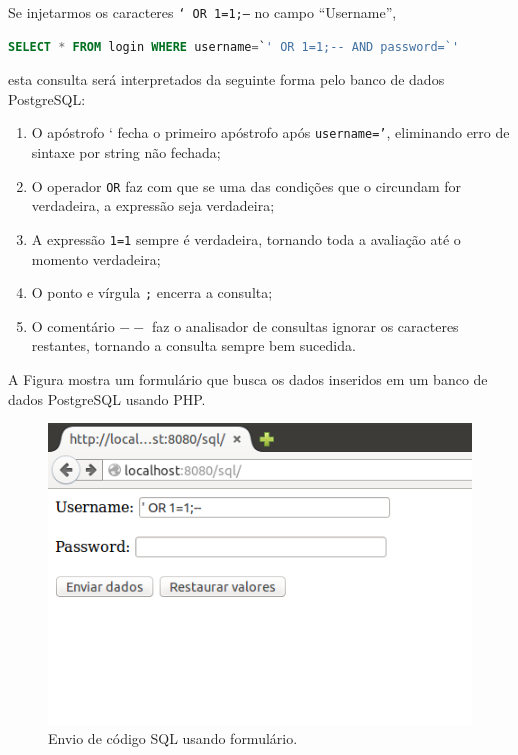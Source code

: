 \begin{frame}[fragile]{}

Se injetarmos os caracteres {\tt ` OR 1=1;--} no campo ``Username'',

\begin{lstlisting}[language=SQL]
SELECT * FROM login WHERE username=`' OR 1=1;-- AND password=`'
\end{lstlisting}

esta consulta será interpretados da seguinte forma pelo banco de dados
PostgreSQL:

\begin{enumerate}
\item O apóstrofo ` fecha o primeiro apóstrofo após {\tt username='},
  eliminando erro de sintaxe por string não fechada;
\item O operador {\tt OR} faz com que se uma das condições que o
  circundam for verdadeira, a expressão seja verdadeira;\pause
\item A expressão {\tt 1=1} sempre é verdadeira, tornando toda a
  avaliação até o momento verdadeira;
\item O ponto e vírgula {\tt ;} encerra a consulta;\pause
\item O comentário {\tt $--$} faz o analisador de consultas ignorar os
  caracteres restantes, tornando a consulta sempre bem sucedida.
\end{enumerate}
\end{frame}

\begin{frame}{}\small
A Figura mostra um formulário que busca os dados inseridos 
em um banco de dados PostgreSQL usando PHP.

  \begin{figure}
    \centering
    \includegraphics[scale=.5]{sql-snd.png}
    \caption{Envio de código SQL usando formulário.}
  \end{figure}
\end{frame}

